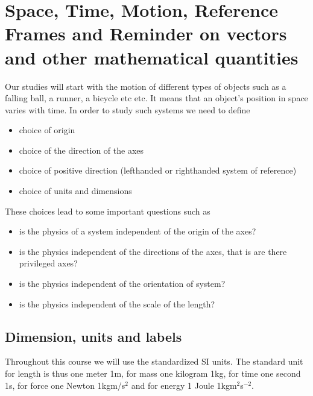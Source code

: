 \documentclass[letterpaper,10pt,english]{sphinxmanual}
\begin{document}
\chapter{Space, Time, Motion, Reference Frames  and Reminder on vectors and other mathematical quantities}
\label{\detokenize{chapter1:space-time-motion-reference-frames-and-reminder-on-vectors-and-other-mathematical-quantities}}
Our studies will start with the motion of different types of objects
such as a falling ball, a runner, a bicycle etc etc. It means that an
object’s position in space varies with time.
In order to study such systems we need to define
\begin{itemize}
\item {} 
choice of origin

\item {} 
choice of the direction of the axes

\item {} 
choice of positive direction (left\sphinxhyphen{}handed or right\sphinxhyphen{}handed system of reference)

\item {} 
choice of units and dimensions

\end{itemize}

These choices lead to some important questions such as
\begin{itemize}
\item {} 
is the  physics of a system independent of the origin of the axes?

\item {} 
is the  physics independent of the directions of the axes, that is are there privileged axes?

\item {} 
is the physics independent of the orientation of system?

\item {} 
is the physics independent of the scale of the length?

\end{itemize}


\section{Dimension, units and labels}
\label{\detokenize{chapter1:dimension-units-and-labels}}
Throughout this course we will use the standardized SI units. The standard unit for length is thus one meter 1m, for mass
one kilogram 1kg, for time one second 1s, for force one Newton 1kgm/s\(^2\) and for energy 1 Joule 1kgm\(^2\)s\(^{-2}\).
\end{document}
